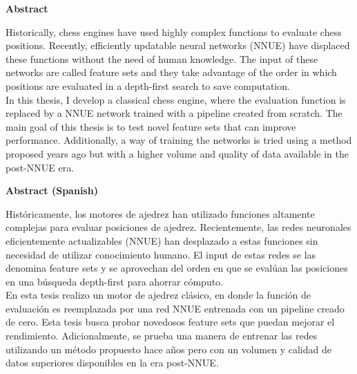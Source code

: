 \thispagestyle{plain}
\begin{center}
\large
\textbf{Abstract}
\end{center}

\begin{center}
\parbox{15cm}{
Historically, chess engines have used highly complex functions to evaluate chess positions. Recently, efficiently updatable neural networks (NNUE) have displaced these functions without the need of human knowledge. The input of these networks are called feature sets and they take advantage of the order in which positions are evaluated in a depth-first search to save computation. \\

In this thesis, I develop a classical chess engine, where the evaluation function is replaced by a NNUE network trained with a pipeline created from scratch. The main goal of this thesis is to test novel feature sets that can improve performance. Additionally, a way of training the networks is tried using a method proposed years ago but with a higher volume and quality of data available in the post-NNUE era.
}
\end{center}

\vspace{1cm}

\begin{center}
\large
\textbf{Abstract (Spanish)}
\end{center}

\begin{center}
\parbox{15cm}{
Históricamente, los motores de ajedrez han utilizado funciones altamente complejas para evaluar posiciones de ajedrez. Recientemente, las redes neuronales eficientemente actualizables (NNUE) han desplazado a estas funciones sin necesidad de utilizar conocimiento humano. El input de estas redes se las denomina feature sets y se aprovechan del orden en que se evalúan las posiciones en una búsqueda depth-first para ahorrar cómputo. \\

En esta tesis realizo un motor de ajedrez clásico, en donde la función de evaluación es reemplazada por una red NNUE entrenada con un pipeline creado de cero. Esta tesis busca probar novedosos feature sets que puedan mejorar el rendimiento. Adicionalmente, se prueba una manera de entrenar las redes utilizando un método propuesto hace años pero con un volumen y calidad de datos superiores disponibles en la era post-NNUE.
}
\end{center}

\clearpage
